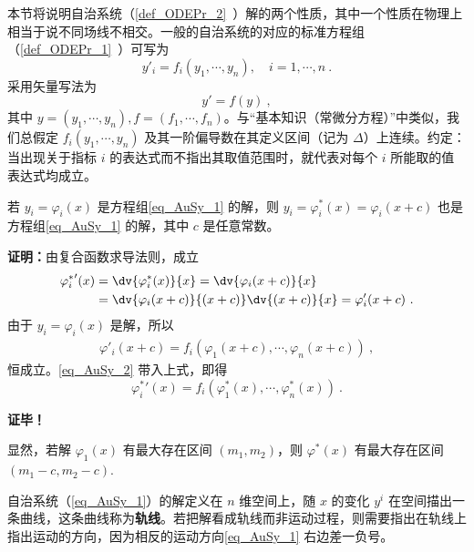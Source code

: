 
本节将说明自治系统（\autoref{def_ODEPr_2}~）解的两个性质，其中一个性质在物理上相当于说不同场线不相交。一般的自治系统的对应的标准方程组（\autoref{def_ODEPr_1}~）可写为
\begin{equation}\label{eq_AuSy_1}
y'_i=f_i(y_1,\cdots,y_n),\quad i=1,\cdots,n~.
\end{equation}
采用矢量写法为
\begin{equation}\label{eq_AuSy_4}
y'=f(y)~,
\end{equation}
其中 $y=(y_1,\cdots,y_n),f=(f_1,\cdots,f_n)$。与“基本知识（常微分方程）”中类似，我们总假定 $f_i(y_1,\cdots,y_n)$ 及其一阶偏导数在其定义区间（记为 $\Delta$）上连续。约定：当出现关于指标 $i$ 的表达式而不指出其取值范围时，就代表对每个 $i$ 所能取的值表达式均成立。

\begin{theorem}{}\label{the_AuSy_1}
若 $y_i=\varphi_i(x)$ 是方程组\autoref{eq_AuSy_1} 的解，则 $y_i=\varphi^*_i(x)=\varphi_i(x+c)$ 也是方程组\autoref{eq_AuSy_1} 的解，其中 $c$ 是任意常数。
\end{theorem}
\textbf{证明：}由复合函数求导法则，成立
\begin{equation}\label{eq_AuSy_2}
\begin{aligned}
{\varphi^*_i}'(x)&=\dv{\varphi^*_i(x)}{x}=\dv{\varphi_i(x+c)}{x}\\
&=\dv{\varphi_i(x+c)}{(x+c)}\dv{(x+c)}{x}=\varphi'_i(x+c)~.
\end{aligned}
\end{equation}
由于 $y_i=\varphi_i(x)$ 是解，所以
\begin{equation}
\begin{aligned}
\varphi'_i(x+c)=f_i(\varphi_1(x+c),\cdots,\varphi_n(x+c))~,
\end{aligned}
\end{equation}
恒成立。\autoref{eq_AuSy_2} 带入上式，即得
\begin{equation}
{\varphi^*_i}'(x)=f_i(\varphi^*_1(x),\cdots,\varphi^*_n(x))~.
\end{equation}

\textbf{证毕！}

显然，若解 $\varphi_1(x)$ 有最大存在区间 $(m_1,m_2)$，则 $\varphi^*(x)$ 有最大存在区间 $(m_1-c,m_2-c)$.

自治系统（\autoref{eq_AuSy_1}）的解定义在 $n$ 维空间上，随 $x$ 的变化 $y^i$ 在空间描出一条曲线，这条曲线称为\textbf{轨线}。若把解看成轨线而非运动过程，则需要指出在轨线上指出运动的方向，因为相反的运动方向\autoref{eq_AuSy_1} 右边差一负号。

